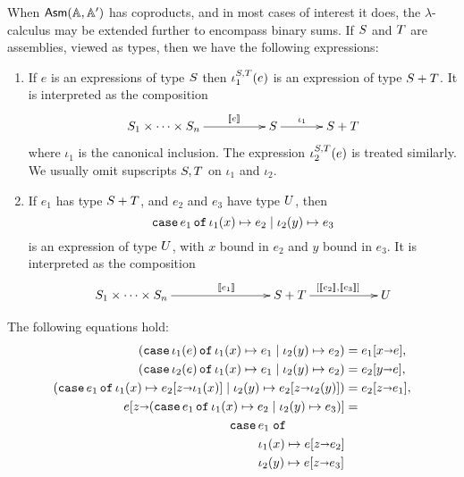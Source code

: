 When $\mathsf{Asm}(\mathbb{A},\mathbb{A}')$ has coproducts, and in most cases of interest it does,
the $\lambda$-calculus may be extended further to encompass binary
sums. If $S$ and $T$ are assemblies, viewed as types, then
we have the following expressions:
%
\begin{enumerate}
\item If $e$ is an expressions of type $S$ then
  $\iota_1^{S,T}(e)$ is an expression of type $S +
  T$. It is interpreted as the composition
  \begin{equation*}
    \xymatrix{
      **[l]{\asm{S}_1 \times \cdots \times \asm{S}_n}
      \ar[r]^{\sem{e}}
      &
      {\asm{S}}
      \ar[r]^{\iota_1}
      &
     **[r]{\asm{S} + \asm{T}}
    }
  \end{equation*}
  where $\iota_1$ is the canonical inclusion. The expression
  $\iota_2^{S,T}(e)$ is treated similarly. We usually omit
  supscripts $S, T$ on $\iota_1$ and $\iota_2$.
\item If $e_1$ has type $S + T$, and $e_2$ and $e_3$ have
  type $U$, then
  \begin{equation*}
    \mathtt{case}\,e_1\,\mathtt{of}\,\iota_1(x) \mapsto e_2 \mid \iota_2(y) \mapsto e_3
  \end{equation*}
  is an expression of type $U$, with $x$ bound in $e_2$ and
  $y$ bound in $e_3$. It is interpreted as the composition
  \begin{equation*}
    \xymatrix@+3em{
      **[l]{\asm{S}_1 \times \cdots \times \asm{S}_n}
      \ar[r]^{\sem{e_1}}
      &
      {\asm{S} + \asm{T}}
      \ar[r]^{[\sem{e_2}, \sem{e_3}]}
      &
      {\asm{U}}
    }
  \end{equation*}
\end{enumerate}
%
The following equations hold:
%
\begin{align*}
  (\mathtt{case}\,\iota_1(e)\,\mathtt{of}\,\iota_1(x) \mapsto e_1 \mid \iota_2(y) \mapsto e_2) &=
  e_1[x {\shortrightarrow} e], \\
  (\mathtt{case}\,\iota_2(e)\,\mathtt{of}\,\iota_1(x) \mapsto e_1 \mid \iota_2(y) \mapsto e_2) &=
  e_2[y {\shortrightarrow} e], \\
  (\mathtt{case}\,e_1\,\mathtt{of}\,\iota_1(x) \mapsto e_2[z {\shortrightarrow} \iota_1(x)] \mid \iota_2(y) \mapsto e_2[z {\shortrightarrow} \iota_2(y)]
  ) &= e_2[z {\shortrightarrow} e_1], \\
  e[z {\shortrightarrow} (\mathtt{case}\,e_1\,\mathtt{of}\,\iota_1(x) \mapsto e_2 \mid \iota_2(y) \mapsto e_3)] &= \\
  \qquad
  \begin{aligned}[t]\mathtt{case}\,&e_1\;\mathtt{of}\\&\iota_1(x) \mapsto e[z {\shortrightarrow} e_2] \\&\iota_2(y) \mapsto e[z {\shortrightarrow} e_3]\end{aligned}
\end{align*}

